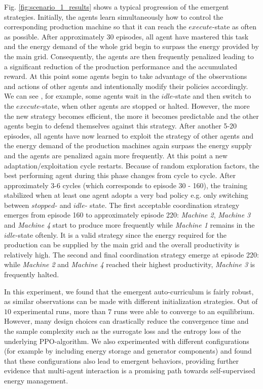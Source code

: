 Fig. \ref{fig:scenario_1_results} shows a typical progression of the emergent strategies. Initially, the agents learn simultaneously how to control the corresponding production machine so that it can reach the $execute$-state as often as possible. After approximately 30 episodes, all agent have mastered this task and the energy demand of the whole grid begin to surpass the energy provided by the main grid. Consequently, the agents are then frequently penalized leading to a significant reduction of the production performance and the accumulated reward. At this point some agents begin to take advantage of the observations and actions of other agents and intentionally modify their policies accordingly. We can see , for example, some agents wait in the $idle$-state and then switch to the $execute$-state, when other agents are stopped or halted. However, the more the new strategy becomes efficient, the more it becomes predictable and the other agents begin to defend themselves against this strategy. After another 5-20 episodes, all agents have now learned to exploit the strategy of other agents and the energy demand of the production machines again surpass the energy supply and the agents are penalized again more frequently. At this point a new adaptation/exploitation cycle restarts. Because of random exploration factors, the best performing agent during this phase changes from cycle to cycle. After approximately 3-6 cycles (which corresponds to episode 30 - 160), the training stabilized when at least one agent adopts a very bad policy e.g. only switching between $stopped$- and $idle$- state. The first acceptable coordination strategy emerges from episode 160 to approximately episode 220: \textit{Machine 2}, \textit{Machine 3} and \textit{Machine 4} start to produce more frequently while \textit{Machine 1} remains in the $idle$-state oftenly. It is a valid strategy since the energy required for the production can be supplied by the main grid and the overall productivity is  relatively high. The second and final coordination strategy emerge at episode 220: while \textit{Machine 2} and \textit{Machine 4} reached their highest productivity,  \textit{Machine 3} is frequently halted.

In this experiment, we found that the emergent auto-curriculum is fairly robust, as similar observations can be made with different initialization strategies. Out of $10$ experimental runs, more than $7$ runs were able to converge to an equilibrium. However, many design choices can drastically reduce the convergence time and the sample complexity such as the surrogate loss and the entropy loss of the underlying PPO-algorithm. We also experimented with different configurations (for example by including energy storage and generator components) and found that these configurations also lead to emergent behaviors, providing further evidence that multi-agent interaction is a promising path towards self-supervised energy management.

